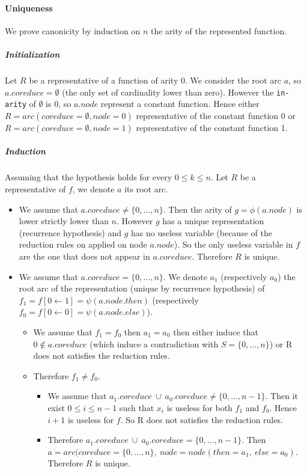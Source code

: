 \documentclass[a4paper,10pt]{article}
\begin{document}
\paragraph{Uniqueness}
We prove canonicity by induction on $n$ the arity of the represented function.
\subparagraph{Initialization}
Let $R$ be a representative of a function of arity 0. We consider the root arc $a$, so $a.coreduce = \emptyset$ (the only set of cardinality lower than zero). However the \texttt{in-arity} of $\emptyset$ is 0, so $a.node$ represent a constant function. Hence either $R = arc(coreduce = \emptyset, node = 0)$ representative of the constant function 0 or $R = arc(coreduce = \emptyset, node = 1)$ representative of the constant function 1.
\subparagraph{Induction}
Assuming that the hypothesis holds for every $0\leq k\leq n$.
Let $R$ be a representative of $f$, we denote $a$ its root arc.
\begin{itemize}
  \item We assume that $a.coreduce \neq \{0, ..., n\}$. Then the arity of $g = \phi(a.node)$ is lower strictly lower than $n$. However $g$ has a unique representation (recurrence hypothesis) and $g$ has no useless variable (because of the reduction rules on applied on node $a.node$). So the only useless variable in $f$ are the one that does not appear in $a.coreduce$. Therefore $R$ is unique.
  \item We assume that $a.coreduce = \{0, ..., n\}$. We denote $a_1$ (respectively $a_0$) the root arc of the representation (unique by recurrence hypothesis) of $f_1 = f[0\leftarrow 1] = \psi(a.node.then)$ (respectively $f_0 = f[0\leftarrow 0] = \psi(a.node.else)$).\begin{itemize}
    \item We assume that $f_1 = f_0$ then $a_1 = a_0$ then either induce that $0\not\in a.coreduce$ (which induce a contradiction with $S=\{0, ..., n\}$) or R does not satisfies the reduction rules.
    \item Therefore $f_1\neq f_0$.\begin{itemize}
      \item We assume that $a_1.coreduce~\cup~a_0.coreduce \neq \{0, ..., n-1\}$. Then it exist $0\leq i\leq n-1$ such that $x_i$ is useless for both $f_1$ and $f_0$. Hence $i+1$ is useless for $f$. So R does not satisfies the reduction rules.
      \item Therefore $a_1.coreduce~\cup~a_0.coreduce = \{0, ..., n-1\}$. Then $a = arc ( coreduce = \{0, ..., n\},~node = node(then = a_1,~else = a_0)$. Therefore $R$ is unique.
    \end{itemize}
  \end{itemize}
\end{itemize}
\end{document}
